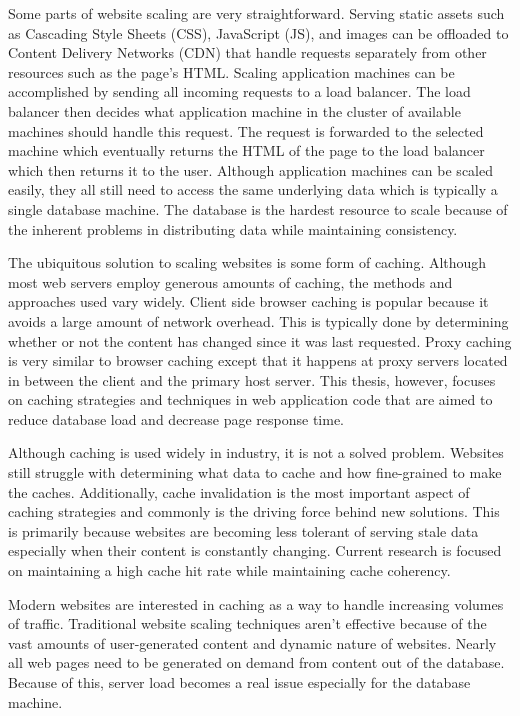 \documentclass[12pt]{ucthesis}
\begin{document}
Some parts of website scaling are very straightforward.
Serving static assets such as Cascading Style Sheets (CSS), JavaScript (JS), and images can be offloaded to Content Delivery Networks (CDN) that handle requests separately from other resources such as the page's HTML.
Scaling application machines can be accomplished by sending all incoming requests to a load balancer.
The load balancer then decides what application machine in the cluster of available machines should handle this request.
The request is forwarded to the selected machine which eventually returns the HTML of the page to the load balancer which then returns it to the user.
Although application machines can be scaled easily, they all still need to access the same underlying data which is typically a single database machine.
The database is the hardest resource to scale because of the inherent problems in distributing data while maintaining consistency.

The ubiquitous solution to scaling websites is some form of caching.
Although most web servers employ generous amounts of caching, the methods and approaches used vary widely.
Client side browser caching is popular because it avoids a large amount of network overhead.
This is typically done by determining whether or not the content has changed since it was last requested.
Proxy caching is very similar to browser caching except that it happens at proxy servers located in between the client and the primary host server.
This thesis, however, focuses on caching strategies and techniques in web application code that are aimed to reduce database load and decrease page response time.

Although caching is used widely in industry, it is not a solved problem.
Websites still struggle with determining what data to cache and how fine-grained to make the caches.
Additionally, cache invalidation is the most important aspect of caching strategies and commonly is the driving force behind new solutions.
This is primarily because websites are becoming less tolerant of serving stale data especially when their content is constantly changing.
Current research is focused on maintaining a high cache hit rate while maintaining cache coherency.

Modern websites are interested in caching as a way to handle increasing volumes of traffic.
Traditional website scaling techniques aren't effective because of the vast amounts of user-generated content and dynamic nature of websites.
Nearly all web pages need to be generated on demand from content out of the database.
Because of this, server load becomes a real issue especially for the database machine.
\end{document}
